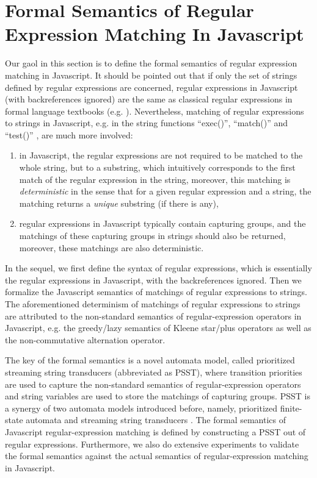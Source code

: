 
\section{Formal Semantics of Regular Expression Matching In Javascript}\label{sec-rwre}
Our gaol in this section is to define the formal semantics of regular expression matching in Javascript. 
%
It should be pointed out that if only the set of strings defined by regular expressions are concerned, regular expressions in Javascript (with backreferences ignored) are the same as classical regular expressions in formal language textbooks (e.g. \cite{HU79}). Nevertheless, matching of regular expressions to strings in Javascript, e.g. in the string functions ``exec()'', ``match()'' and ``test()'' , are much more involved: 
\begin{enumerate}
\item in Javascript, the regular expressions are not required to be matched to the whole string, but to a substring, which intuitively corresponds to the first match of the regular expression in the string, moreover, this matching is \emph{deterministic} in the sense that for a given regular expression and a string, the matching returns a \emph{unique} substring (if there is any), 
%
\item regular expressions in Javascript typically contain capturing groups, and the matchings of these capturing groups in strings should also be returned, moreover, these matchings are also deterministic.
\end{enumerate}

In the sequel, we first define the syntax of regular expressions, which is essentially the regular expressions in Javascript, with the backreferences ignored. 
%
Then we formalize the Javascript semantics of matchings of regular expressions to strings. The aforementioned determinism of matchings of regular expressions to strings are attributed to the non-standard semantics of regular-expression operators in Javascript, e.g. the greedy/lazy semantics of Kleene star/plus operators as well as the non-commutative alternation operator.  

The key of the formal semantics is a novel automata model, called prioritized streaming string transducers (abbreviated as PSST), where transition priorities are used to capture the non-standard semantics of regular-expression operators and string variables are used to store the matchings of capturing groups. PSST is a synergy of two automata models introduced before, namely, prioritized finite-state automata \cite{BM17} and streaming string transducers \cite{AC10,AD11}. The formal semantics of Javascript regular-expression matching is defined by constructing a PSST out of regular expressions. 
%
Furthermore, we also do extensive experiments to validate the formal semantics against the actual semantics of regular-expression matching in Javascript.

